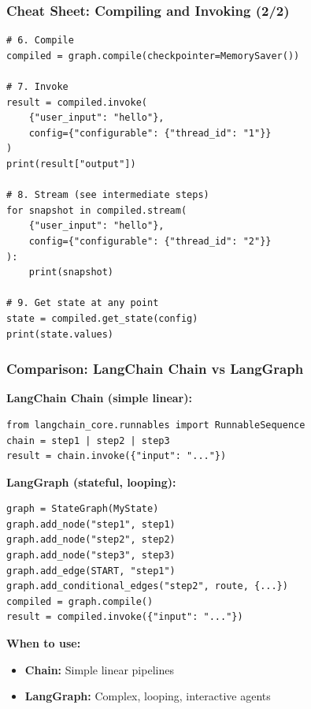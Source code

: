 \documentclass[aspectratio=169,11pt]{beamer}
\begin{document}
\begin{frame}[fragile]
\frametitle{Cheat Sheet: Compiling and Invoking (2/2)}
\begin{lstlisting}
# 6. Compile
compiled = graph.compile(checkpointer=MemorySaver())

# 7. Invoke
result = compiled.invoke(
    {"user_input": "hello"},
    config={"configurable": {"thread_id": "1"}}
)
print(result["output"])

# 8. Stream (see intermediate steps)
for snapshot in compiled.stream(
    {"user_input": "hello"},
    config={"configurable": {"thread_id": "2"}}
):
    print(snapshot)

# 9. Get state at any point
state = compiled.get_state(config)
print(state.values)
\end{lstlisting}
\end{frame}

\begin{frame}[fragile]
\frametitle{Comparison: LangChain Chain vs LangGraph}
\textbf{LangChain Chain (simple linear):}
\begin{lstlisting}
from langchain_core.runnables import RunnableSequence
chain = step1 | step2 | step3
result = chain.invoke({"input": "..."})
\end{lstlisting}

\vspace{10pt}
\textbf{LangGraph (stateful, looping):}
\begin{lstlisting}
graph = StateGraph(MyState)
graph.add_node("step1", step1)
graph.add_node("step2", step2)
graph.add_node("step3", step3)
graph.add_edge(START, "step1")
graph.add_conditional_edges("step2", route, {...})
compiled = graph.compile()
result = compiled.invoke({"input": "..."})
\end{lstlisting}

\vspace{10pt}
\textbf{When to use:}
\begin{itemize}
    \setlength{\itemsep}{1pt}
  \item \textbf{Chain:} Simple linear pipelines
  \item \textbf{LangGraph:} Complex, looping, interactive agents
\end{itemize}
\end{frame}
\end{document}
